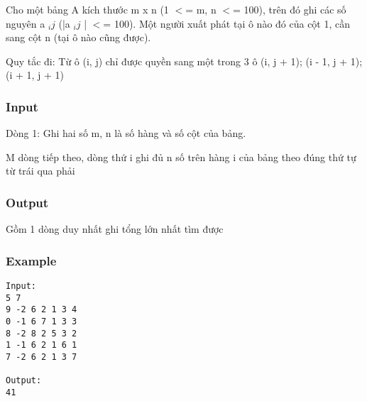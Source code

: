 



   Cho một bảng A kích thước m x n (1 $<$= m, n $<$= 100), trên đó ghi các số nguyên a   $_    ij   $   (|a   $_    ij   $   | $<$= 100). Một người xuất phát tại ô nào đó của cột 1, cần sang cột n (tại ô nào cũng được).  

   Quy tắc đi: Từ ô (i, j) chỉ được quyền sang một trong 3 ô (i, j + 1); (i - 1, j + 1); (i + 1, j + 1)  

\subsubsection{   Input  }

   Dòng 1: Ghi hai số m, n là số hàng và số cột của bảng.  

   M dòng tiếp theo, dòng thứ i ghi đủ n số trên hàng i của bảng theo đúng thứ tự từ trái qua phải  

\subsubsection{   Output  }

   Gồm 1 dòng duy nhất ghi tổng lớn nhất tìm được  

\subsubsection{   Example  }
\begin{verbatim}
Input:
5 7
9 -2 6 2 1 3 4
0 -1 6 7 1 3 3
8 -2 8 2 5 3 2
1 -1 6 2 1 6 1
7 -2 6 2 1 3 7

Output:
41
\end{verbatim}